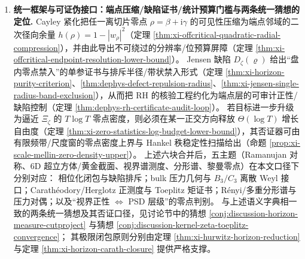 \begin{enumerate}
  \item \textbf{统一框架与可证伪接口：端点压缩/缺陷证书/统计预算门槛与两条统一猜想的定位.}
  Cayley 紧化把任一离切片零点 \(\rho=\beta+\mathrm{i}\gamma\) 的可见性压缩为端点邻域的二次径向余量
  \(h(\rho)=1-|w_\rho|^2\)（定理 \ref{thm:xi-offcritical-quadratic-radial-compression}），并由此导出不可绕过的分辨率/位预算屏障（定理 \ref{thm:xi-offcritical-endpoint-resolution-lower-bound}）。
  Jensen 缺陷 \(D_{\zeta}(\varrho)\) 给出“盘内零点禁入”的单参证书与排斥半径/带状禁入形式（定理 \ref{thm:xi-horizon-purity-criterion}、\ref{thm:dephys-defect-repulsion-radius}、\ref{thm:xi-jensen-single-radius-band-exclusion}），从而把 RH 的核验工程约化为端点层的可审计正性/缺陷控制（定理 \ref{thm:dephys-rh-certificate-audit-loop}）。
  若目标进一步升级为逼近 \(\Xi_\zeta\) 的 \(T\log T\) 零点密度，则必须在某一正交方向释放 \(\Theta(\log T)\) 增长自由度（定理 \ref{thm:xi-zero-statistics-log-budget-lower-bound}），其否证器可由有限频带/尺度窗的零点密度上界与 Hankel 秩稳定性扫描给出（命题 \ref{prop:xi-scale-mellin-zero-density-upper}）。
  上述六块合并后，五主题（Ramanujan 对称、\(6\)D 超立方体/黄金截面、视界谱测度、分形谱、黎曼零点）在本文口径下分别对应：
  相位化闭包与缺陷排斥；bulk 压力几何与 \(B_3/C_3\) 离散 Weyl 接口；Carath\'eodory/Herglotz 正测度与 Toeplitz 矩证书；Rényi/多重分形谱与压力对偶；以及“视界正性 \(\Leftrightarrow\) PSD 层级”的零点判别。
  与上述语义字典相一致的两条统一猜想及其否证口径，见讨论节中的猜想 \ref{conj:discussion-horizon-measure-cutproject} 与猜想 \ref{conj:discussion-kernel-zeta-toeplitz-convergence}；
  其极限闭包原则分别由定理 \ref{thm:xi-hurwitz-horizon-reduction} 与定理 \ref{thm:xi-horizon-carath-closure} 提供严格支撑。
\end{enumerate}


